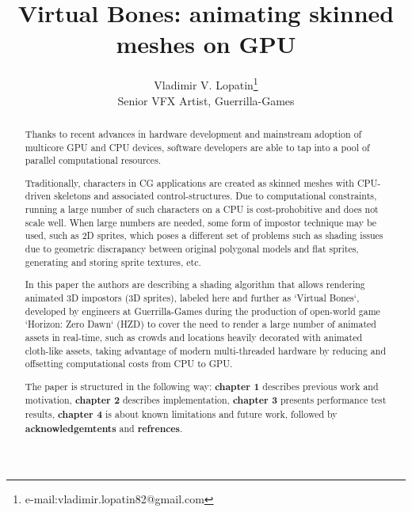 \documentclass{acmsiggraph}
\title{Virtual Bones: animating skinned meshes on GPU}
\author{Vladimir V. Lopatin\thanks{e-mail:vladimir.lopatin82@gmail.com}\\Senior VFX Artist, Guerrilla-Games}
\begin{document}


\maketitle

\begin{abstract}

  Thanks to recent advances in hardware development and mainstream adoption of  multicore GPU and CPU devices, software developers are able to tap into a pool of parallel computational resources.


  Traditionally, characters in CG applications are created as skinned meshes with CPU-driven skeletons and associated control-structures.  Due to computational constraints, running a large number of such characters on a CPU is cost-prohobitive and does not scale well.  When large numbers are needed, some form of impostor technique may be used, such as 2D sprites, which poses a different set of problems such as shading issues due to geometric discrapancy between original polygonal models and flat sprites, generating and storing sprite textures, etc.

  In this paper the authors are describing a shading algorithm that allows rendering animated 3D impostors (3D sprites), labeled here and further as `Virtual Bones`, developed by engineers at Guerrilla-Games during the production of open-world game `Horizon: Zero Dawn` (HZD) to cover the need to render a large number of animated assets in real-time, such as crowds and locations heavily decorated with animated cloth-like assets, taking advantage of modern multi-threaded hardware by reducing and offsetting computational costs from CPU to GPU.

  The paper is structured in the following way: \textbf{chapter 1} describes previous work and motivation, \textbf{chapter 2} describes implementation, \textbf{chapter 3} presents performance test results, \textbf{chapter 4} is about known limitations and future work, followed by \textbf{acknowledgemtents} and \textbf{refrences}.
\end{abstract}
\end{document}
